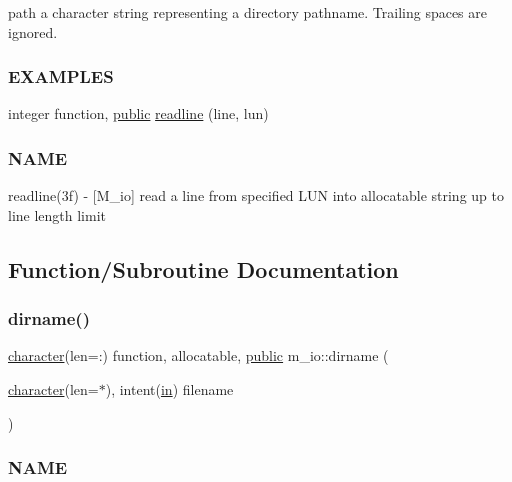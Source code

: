 \begin{DoxyCompactItemize}
\begin{DoxyCompactList}
path a character string representing a directory pathname. Trailing spaces are ignored. \subsubsection*{E\+X\+A\+M\+P\+L\+ES}\end{DoxyCompactList}\item 
integer function, \hyperlink{M__stopwatch_83_8txt_a2f74811300c361e53b430611a7d1769f}{public} \hyperlink{namespacem__io_a8d9ee59e21830662fa59c300ca23e04b}{readline} (line, lun)
\begin{DoxyCompactList}\small\item\em \subsubsection*{N\+A\+ME}

readline(3f) -\/ \mbox{[}M\+\_\+io\mbox{]} read a line from specified L\+UN into allocatable string up to line length limit \end{DoxyCompactList}\end{DoxyCompactItemize}


\subsection{Function/\+Subroutine Documentation}
\mbox{\label{namespacem__io_a85eb6aa886ca8e591fdc837919f81708}} 
\subsubsection{\texorpdfstring{dirname()}{dirname()}}
{\footnotesize\ttfamily \hyperlink{option__stopwatch_83_8txt_abd4b21fbbd175834027b5224bfe97e66}{character}(len=\+:) function, allocatable, \hyperlink{M__stopwatch_83_8txt_a2f74811300c361e53b430611a7d1769f}{public} m\+\_\+io\+::dirname (\begin{DoxyParamCaption}\item[{\hyperlink{option__stopwatch_83_8txt_abd4b21fbbd175834027b5224bfe97e66}{character}(len=$\ast$), intent(\hyperlink{M__journal_83_8txt_afce72651d1eed785a2132bee863b2f38}{in})}]{filename }\end{DoxyParamCaption})}



\subsubsection*{N\+A\+ME}

